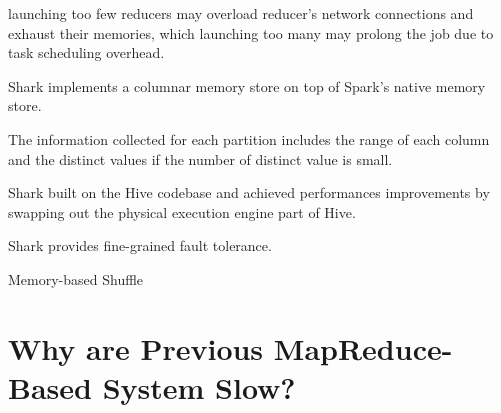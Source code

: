 \documentclass[conference]{IEEEtran}
\begin{document}
	launching too few reducers may overload reducer's network connections and exhaust their memories, which launching too many may prolong the job due to task scheduling overhead.	
	
	Shark implements a columnar memory store on top of Spark's native memory store.
	
	The information collected for each partition includes the range of each column and the distinct values if 
	the number of distinct value is small.
	
	Shark built on the Hive codebase and achieved performances improvements by swapping out the physical execution 
	engine part of Hive.
	
	Shark provides fine-grained fault tolerance.
	
	Memory-based Shuffle
	
	\section{Why are Previous MapReduce-Based System Slow?}
	
\end{document}
